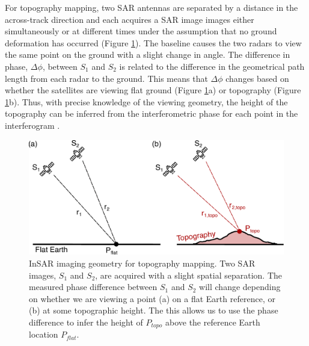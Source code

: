For topography mapping, two SAR antennas are separated by a distance in the across-track direction and each acquires a SAR image images either simultaneously or at different times under the assumption that no ground deformation has occurred (Figure \ref{fig:ch3-insar-geometry-topo}). The baseline causes the two radars to view the same point on the ground with a slight change in angle.
The difference in phase, $\Delta \phi$, between $S_1$ and $S_2$ is related to the difference in the geometrical path length from each radar to the ground.
This means that $\Delta \phi$ changes based on whether the satellites are viewing flat ground (Figure \ref{fig:ch3-insar-geometry-topo}a) or topography (Figure \ref{fig:ch3-insar-geometry-topo}b). Thus, with precise knowledge of the viewing geometry, the height of the topography can be inferred from the interferometric phase for each point in the interferogram \cite{Simons2007InterferometricSyntheticAperture}. 


\begin{figure}
	\centering
	\includegraphics[width=0.99\linewidth]{figures/chapter3-sar/ch3-insar-geometry-topo.pdf}
	\caption[InSAR imaging geometry for topography mapping]{InSAR imaging geometry for topography mapping. Two SAR images, $S_1$ and $S_2$, are acquired with a slight spatial separation. The measured phase difference between $S_1$ and $S_2$ will change depending on whether we are viewing a point (a) on a flat Earth reference, or (b) at some topographic height.
		 The this allows us to use the phase difference to infer the height of $P_{topo}$ above the reference Earth location $P_{flat}$.
	}
	\label{fig:ch3-insar-geometry-topo}
\end{figure}


